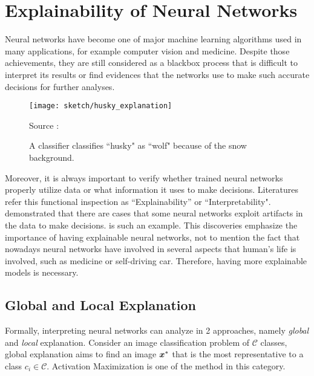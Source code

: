 \section{Explainability of Neural Networks}
Neural networks have become one of major machine learning algorithms used in many applications, for example computer vision and medicine. Despite those achievements, they are still considered as a blackbox process that is  difficult to interpret its results or find evidences that the networks use to make such accurate decisions for further analyses.


%  
%
%


 \begin{figure}[!hbt]
	 		\centering
			\texttt{[image: sketch/husky\_explanation]}
			\caption{A classifier classifies ``husky" as ``wolf" because of the snow background.}
			  \small{ Source : \cite{RibeiroWhyShouldTrust2016} }
			\label{fig:husky_explanation}
\end{figure}


Moreover, it is always important to verify whether trained neural networks properly utilize data or what information it uses to make decisions. Literatures refer this functional inspection as ``Explainability'' or ``Interpretability". \cite{BachAnalyzingclassifiersFisher2016, RibeiroWhyShouldTrust2016} demonstrated that there are cases that some neural networks exploit artifacts in the data to make decisions. \addfigure{\ref{fig:husky_explanation}} is such an example. This discoveries emphasize the importance of having explainable neural networks, not to mention the fact that nowadays neural networks have involved in several aspects that human's life is involved, such as medicine or self-driving car. Therefore, having more explainable models is necessary.

\subsection{Global and Local Explanation}
Formally, interpreting neural networks can analyze in 2 approaches, namely \textit{global} and \textit{local} explanation. Consider an image  classification problem of $\mathcal{C}$ classes, global explanation aims to find an image $\patvector{x}^*$ that is the most representative to a class $c_i \in \mathcal{C}$. Activation Maximization\cite{ErhanUnderstandingRepresentationsLearned2010} is one of the method in this category.

